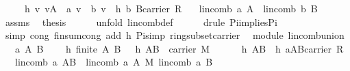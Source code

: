 \begin{isabellebody}
\ \ \ \ \ h{}{\isacharcolon}\ {\isachardoublequoteopen}{\isasymAnd}v{\isachardot}\ v{\isasymin}A\ {\isasymLongrightarrow}\ a\ v\ {\isacharequal}\ b\ v{\isachardoublequoteclose}\ \ h{}{\isacharcolon}\ {\isachardoublequoteopen}b{\isasymin}\ B{\isasymrightarrow}carrier\ R{\isachardoublequoteclose}\isanewline
\ \ \ {\isachardoublequoteopen}lincomb\ a\ A\ {\isacharequal}\ lincomb\ b\ B{\isachardoublequoteclose}\isanewline
%
\isadelimproof
%
\endisadelimproof
%
\isatagproof
{}\isamarkupfalse%
\ {\isacharminus}\ \isanewline
\ \ \isamarkupfalse%
\ assms\ \isamarkupfalse%
\ {\isacharquery}thesis\isanewline
\ \ \ \ \isamarkupfalse%
\ {\isacharparenleft}unfold\ lincomb{\isacharunderscore}def{\isacharparenright}\isanewline
\ \ \ \ \isamarkupfalse%
\ {\isacharparenleft}drule\ Pi{\isacharunderscore}implies{\isacharunderscore}Pi{}{\isacharparenright}{\isacharplus}\isanewline
\ \ \ \ \isamarkupfalse%
\ {\isacharparenleft}simp\ cong{\isacharcolon}\ finsum{\isacharunderscore}cong{}\ add{\isacharcolon}\ h{}\ Pi{\isacharunderscore}simp\ ring{\isacharunderscore}subset{\isacharunderscore}carrier{\isacharparenright}\isanewline
{}\isamarkupfalse%
%
\endisatagproof
{\isafoldproof}%
%
\isadelimproof
\isanewline
%
\endisadelimproof
\isanewline
{}\isamarkupfalse%
\ {\isacharparenleft}\ module{\isacharparenright}\ lincomb{\isacharunderscore}union{\isacharcolon}\isanewline
\ \ \ a\ A\ B\ \isanewline
\ \ \ h{}{\isacharcolon}\ {\isachardoublequoteopen}finite\ {\isacharparenleft}A{\isasymunion}\ B{\isacharparenright}{\isachardoublequoteclose}\ \ \ h{}{\isacharcolon}\ {\isachardoublequoteopen}A{\isasymunion}B\ {\isasymsubseteq}\ carrier\ M{\isachardoublequoteclose}\ \isanewline
\ \ \ \ \ h{}{\isacharcolon}\ {\isachardoublequoteopen}A{\isasyminter}B{\isacharequal}{\isacharbraceleft}{\isacharbraceright}{\isachardoublequoteclose}\ \ h{}{\isacharcolon}\ {\isachardoublequoteopen}a{\isasymin}{\isacharparenleft}A{\isasymunion}B{\isasymrightarrow}carrier\ R{\isacharparenright}{\isachardoublequoteclose}\isanewline
\ \ \ {\isachardoublequoteopen}lincomb\ a\ {\isacharparenleft}A{\isasymunion}B{\isacharparenright}\ {\isacharequal}\ lincomb\ a\ A\ {\isasymoplus}\isactrlbsub M\isactrlesub \ lincomb\ a\ B{\isachardoublequoteclose}\isanewline

\end{isabellebody}
